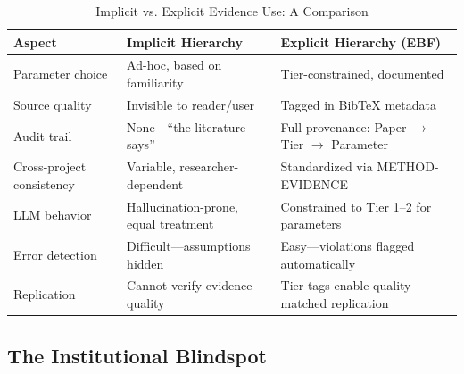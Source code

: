 \documentclass[11pt, a4paper]{article}
\begin{document}
\begin{table}[htbp]
\centering
\caption{Implicit vs. Explicit Evidence Use: A Comparison}
\label{tab:evd-implicit-explicit}
\renewcommand{\arraystretch}{1.3}
\begin{tabular}{@{}p{3.5cm}p{5cm}p{5cm}@{}}
\toprule
\textbf{Aspect} & \textbf{Implicit Hierarchy} & \textbf{Explicit Hierarchy (EBF)} \\
\midrule
Parameter choice & Ad-hoc, based on familiarity & Tier-constrained, documented \\
Source quality & Invisible to reader/user & Tagged in BibTeX metadata \\
Audit trail & None---``the literature says'' & Full provenance: Paper $\to$ Tier $\to$ Parameter \\
Cross-project consistency & Variable, researcher-dependent & Standardized via METHOD-EVIDENCE \\
LLM behavior & Hallucination-prone, equal treatment & Constrained to Tier 1--2 for parameters \\
Error detection & Difficult---assumptions hidden & Easy---violations flagged automatically \\
Replication & Cannot verify evidence quality & Tier tags enable quality-matched replication \\
\bottomrule
\end{tabular}
\end{table}

\subsection{The Institutional Blindspot}
\end{document}
